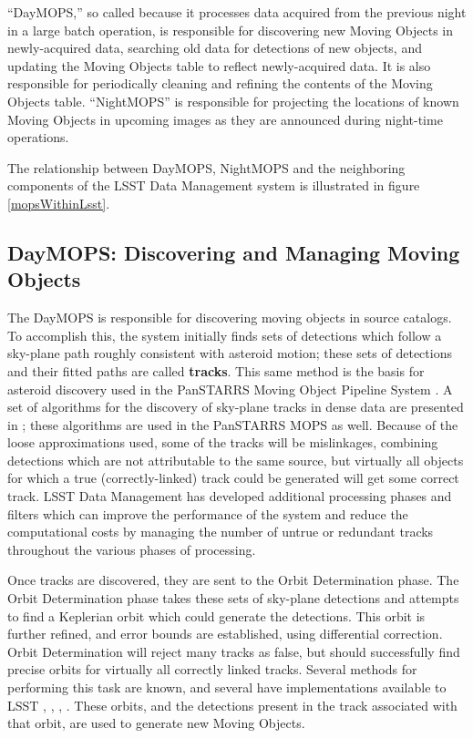 \documentclass[12pt,preprint]{aastex}
\begin{document}
``DayMOPS,'' so called because it processes data acquired from the
previous night in a large batch operation, is responsible for
discovering new Moving Objects in newly-acquired data, searching old
data for detections of new objects, and updating the Moving Objects
table to reflect newly-acquired data. It is also responsible for
periodically cleaning and refining the contents of the Moving Objects
table.  ``NightMOPS'' is responsible for projecting the locations of known
Moving Objects in upcoming images as they are announced during
night-time operations.  

The relationship between DayMOPS, NightMOPS and the neighboring
components of the LSST Data Management system is illustrated in
figure \ref{mopsWithinLsst}.

\subsection{DayMOPS: Discovering and Managing Moving Objects}



The DayMOPS is responsible for discovering moving objects in source
catalogs.  To accomplish this, the system initially finds sets of
detections which follow a sky-plane path roughly consistent with
asteroid motion; these sets of detections and their fitted paths are
called \textbf{tracks}.  This same method is the basis for asteroid
discovery used in the PanSTARRS Moving Object Pipeline System
\citep{psMOPSDesign}.  A set of algorithms for the discovery of
sky-plane tracks in dense data are presented in
\citet{Kubica:2005:MTA:1081870.1081889}; these algorithms are used in
the PanSTARRS MOPS as well.  Because of the loose approximations used,
some of the tracks will be mislinkages, combining detections which are
not attributable to the same source, but virtually all objects for
which a true (correctly-linked) track could be generated will get some
correct track.  LSST Data Management has developed additional
processing phases and filters which can improve the performance of the
system and reduce the computational costs by managing the number of
untrue or redundant tracks throughout the various phases of
processing.

Once tracks are discovered, they are sent to the Orbit Determination
phase. The Orbit Determination phase takes these sets of sky-plane
detections and attempts to find a Keplerian orbit which could generate
the detections.  This orbit is further refined, and error bounds are
established, using differential correction.  Orbit Determination will
reject many tracks as false, but should successfully find precise
orbits for virtually all correctly linked tracks.  Several methods for
performing this task are known, and several have implementations
available to LSST \citep{Milani04orbitdetermination},
\citep{Milani2006}, \citep{OpenOrb2009}, \citep{granvik_thesis}.
These orbits, and the detections present in the track associated with
that orbit, are used to generate new Moving Objects.
\end{document}
